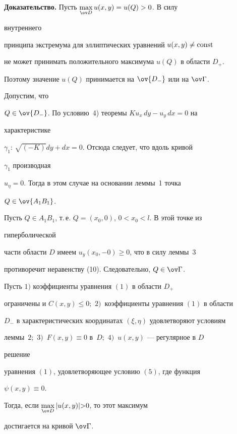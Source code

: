  


{\bf Доказательство.} Пусть $\max\limits_{\ov D}u(x,y)=u(Q)>0$. В силу 


внутреннего 


принципа экстремума для эллиптических уравнений $u(x,y)\ne\operatorname{const}$ 


не может принимать положительного максимума $u(Q)$ в области $D_+$. 


Поэтому значение $u(Q)$ принимается на $\ov{D_-}$ или на $\ov\Gamma$. 


Допустим, что 


$Q\in\ov{D_-}$. По условию~4) теоремы $K u_x\,dy-u_y\,dx=0$ на 


характеристике 


$\gamma_1$: $\sqrt{(-K)}dy+dx=0$. Отсюда следует, что вдоль кривой 


$\gamma_1$ производная 


$u_\eta=0$. Тогда в этом случае на основании леммы~1 точка 


$Q\in\ov{A_1B_1}$. 


Пусть $Q\in A_1B_1$, т.\,е. $Q=(x_0,0)$, $0<x_0<l$. В этой точке из 


гиперболической 


части области $D$ имеем $u_y(x_0,-0)\ge0$, что в силу леммы~3 


противоречит неравенству (10). Следовательно, $Q\in\ov\Gamma$. 


 


\begin{thm} 


Пусть $1)$ коэффициенты уравнения $(1)$ в области $D_+$ 


ограничены и $C(x,y){\le}0;$ $2)$~коэффициенты уравнения $(1)$ в области 


$D_-$ в характеристических координатах $(\xi,\eta)$ удовлетворяют условиям 


леммы~$2;$ $3)$~$F(x,y)\equiv0$ в~$D;$ $4)$~$u(x,y)$ --- регулярное в $D$ 


решение 


уравнения $(1)$, удовлетворяющее условию $(5)$, где функция 


$\psi(x,y)\equiv0$. 


Тогда, если $\max\limits_{\ov D}|u(x,y)|{>}0$, то этот максимум 


достигается на кривой $\ov\Gamma$. 


\end{thm} 


